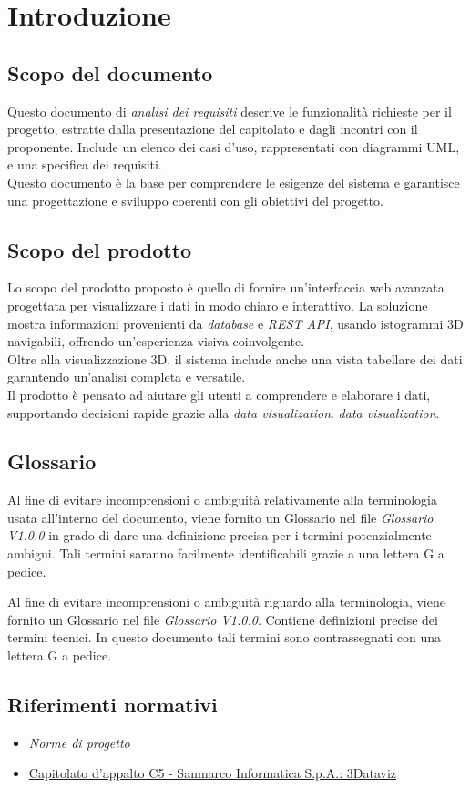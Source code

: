 \section{Introduzione}
\subsection{Scopo del documento}
Questo documento di \textit{analisi dei requisiti} descrive le funzionalità richieste per il progetto, estratte dalla presentazione del capitolato e dagli incontri con il proponente. 
Include un elenco dei casi d'uso, rappresentati con diagrammi UML, e una specifica dei requisiti.\\
Questo documento è la base per comprendere le esigenze del sistema e garantisce una progettazione e sviluppo coerenti con gli obiettivi del progetto.
\subsection{Scopo del prodotto}
Lo scopo del prodotto proposto è quello di fornire un'interfaccia web avanzata progettata per visualizzare i dati in modo chiaro e interattivo.
La soluzione mostra informazioni provenienti da \textit{database} e \textit{REST API}, usando istogrammi 3D navigabili, offrendo un'esperienza visiva coinvolgente.\\
Oltre alla visualizzazione 3D, il sistema include anche una vista tabellare dei dati garantendo un'analisi completa e versatile.\\
Il prodotto è pensato ad aiutare gli utenti a comprendere e elaborare i dati, supportando decisioni rapide grazie alla \textit{data visualization}.
\textit{data visualization}.
\subsection{Glossario}
Al fine di evitare incomprensioni o ambiguità relativamente alla terminologia
usata all'interno del documento, viene fornito un Glossario nel file
\textit{Glossario V1.0.0} in grado di dare una definizione precisa per i
termini potenzialmente ambigui. Tali termini saranno facilmente identificabili
grazie a una lettera G a pedice.

Al fine di evitare incomprensioni o ambiguità riguardo alla terminologia, viene fornito un Glossario nel file \textit{Glossario V1.0.0}. Contiene definizioni precise dei termini tecnici. In questo documento tali termini sono contrassegnati con una lettera G a pedice.
\subsection{Riferimenti normativi}
\begin{itemize}
      \item {\textit{Norme di progetto}}
      \item \href{https://www.math.unipd.it/~tullio/IS-1/2024/Progetto/C5.pdf}
            {Capitolato d'appalto C5 - Sanmarco Informatica S.p.A.: 3Dataviz}
\end{itemize}
